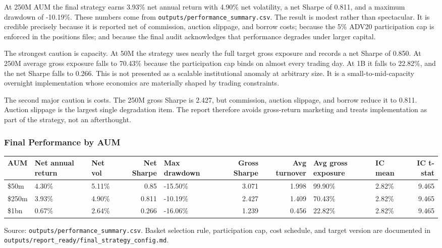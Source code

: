 \documentclass[
]{article}
\begin{document}
At 250M AUM the final strategy earns 3.93\% net annual return with
4.90\% net volatility, a net Sharpe of 0.811, and a maximum drawdown of
-10.19\%. These numbers come from
\texttt{outputs/performance\_summary.csv}. The result is modest rather
than spectacular. It is credible precisely because it is reported net of
commission, auction slippage, and borrow costs; because the 5\% ADV20
participation cap is enforced in the positions files; and because the
final audit acknowledges that performance degrades under larger capital.

The strongest caution is capacity. At 50M the strategy uses nearly the
full target gross exposure and records a net Sharpe of 0.850. At 250M
average gross exposure falls to 70.43\% because the participation cap
binds on almost every trading day. At 1B it falls to 22.82\%, and the
net Sharpe falls to 0.266. This is not presented as a scalable
institutional anomaly at arbitrary size. It is a small-to-mid-capacity
overnight implementation whose economics are materially shaped by
trading constraints.

The second major caution is costs. The 250M gross Sharpe is 2.427, but
commission, auction slippage, and borrow reduce it to 0.811. Auction
slippage is the largest single degradation item. The report therefore
avoids gross-return marketing and treats implementation as part of the
strategy, not an afterthought.

\hypertarget{final-performance-by-aum}{%
\subsubsection{Final Performance by
AUM}\label{final-performance-by-aum}}

\begin{longtable}[]{@{}lllrlrrllr@{}}
\toprule
AUM & Net annual return & Net vol & Net Sharpe & Max drawdown & Gross
Sharpe & Avg turnover & Avg gross exposure & IC mean & IC t-stat \\
\midrule
\endhead
\$50m & 4.30\% & 5.11\% & 0.85 & -15.50\% & 3.071 & 1.998 & 99.90\% &
2.82\% & 9.465 \\
\$250m & 3.93\% & 4.90\% & 0.811 & -10.19\% & 2.427 & 1.409 & 70.43\% &
2.82\% & 9.465 \\
\$1bn & 0.67\% & 2.64\% & 0.266 & -16.06\% & 1.239 & 0.456 & 22.82\% &
2.82\% & 9.465 \\
\bottomrule
\end{longtable}

Source: \texttt{outputs/performance\_summary.csv}. Basket selection
rule, participation cap, cost schedule, and target version are
documented in \texttt{outputs/report\_ready/final\_strategy\_config.md}.
\end{document}
